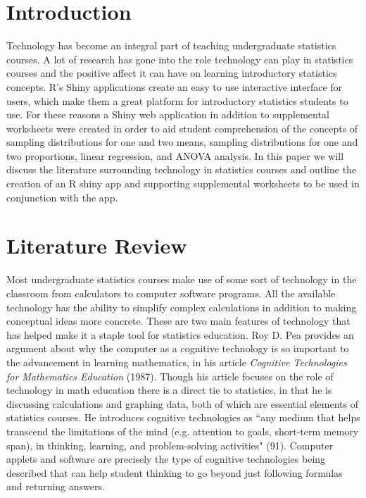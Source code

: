 \documentclass[11pt]{book}
\begin{document}
\section{Introduction}
Technology has become an integral part of teaching undergraduate statistics courses. A lot of research has gone into the role technology can play in statistics courses and the positive affect  it can have on learning introductory statistics concepts.  R's Shiny applications create an easy to use interactive interface for users, which make them a great platform for introductory statistics students to use.  For these reasons a Shiny web application in addition to supplemental worksheets were created in order to aid student comprehension of the concepts of sampling distributions for one and two means, sampling distributions for one and two proportions, linear regression, and ANOVA analysis.   In this paper we will discuss the literature surrounding technology in statistics courses and outline the creation of an R shiny app and supporting supplemental worksheets to be used in conjunction with the app. 


\section{Literature Review}

	   
	   	
	Most undergraduate statistics courses make use of some sort of technology in the classroom from calculators to computer software programs.  All the available technology has the ability to simplify complex calculations in addition to making conceptual ideas more concrete.  These are two main features of technology that has helped make it a staple tool for statistics education.  Roy D. Pea provides an argument about why the computer as a cognitive technology is so important to the advancement in learning mathematics, in his article \emph{Cognitive Technologies for Mathematics Education} (1987).  Though his article focuses on the role of technology in math education there is a direct tie to statistics, in that he is discussing calculations and graphing data, both of which are essential elements of statistics courses.  He introduces cognitive technologies as ``any medium that helps transcend the limitations of the mind (e.g. attention to goals, short-term memory span), in thinking, learning, and problem-solving activities" (91). Computer applets and software are precisely the type of cognitive technologies being described that can help student thinking to go beyond just following formulas and returning answers.  
		
\end{document}
